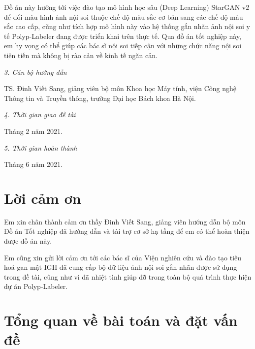 \documentclass[12pt]{extreport}
\begin{document}
Đồ án này hướng tới việc đào tạo mô hình học sâu (Deep Learning) StarGAN v2 để đổi màu hình ảnh nội soi thuộc chế độ màu sắc cơ bản sang các chế độ màu sắc cao cấp, cũng như tích hợp mô hình này vào hệ thống gắn nhãn ảnh nội soi y tế Polyp-Labeler đang được triển khai trên thực tế. Qua đồ án tốt nghiệp này, em hy vọng có thể giúp các bác sĩ nội soi tiếp cận với những chức năng nội soi tiên tiến mà không bị rào cản về kinh tế ngăn cản.

\textit{3. Cán bộ hướng dẫn}

TS. Đinh Viết Sang, giảng viên bộ môn Khoa học Máy tính, viện Công nghệ Thông tin và Truyền thông, trường Đại học Bách khoa Hà Nội.

\textit{4. Thời gian giao đề tài}

Tháng 2 năm 2021.

\textit{5. Thời gian hoàn thành}

Tháng 6 năm 2021.

\vspace{1cm}
\begin{center}
    \fontsize{10pt}{1}
\end{center}

\chapter*{Lời cảm ơn}

Em xin chân thành cảm ơn thầy Đinh Viết Sang, giảng viên hướng dẫn bộ môn Đồ án Tốt nghiệp đã hướng dẫn và tài trợ cơ sở hạ tầng để em có thể hoàn thiện được đồ án này.

Em cũng xin gửi lời cảm ơn tới các bác sĩ của Viện nghiên cứu và đào tạo tiêu hoá gan mật IGH đã cung cấp bộ dữ liệu ảnh nội soi gắn nhãn được sử dụng trong đề tài, cũng như vì đã nhiệt tình giúp đỡ trong toàn bộ quá trình thực hiện dự án Polyp-Labeler.

\tableofcontents

\chapter{Tổng quan về bài toán và đặt vấn đề}
\end{document}
